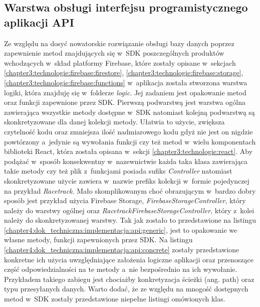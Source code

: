 \documentclass[../Kamil_Kowalewski_Main.tex]{subfiles}
\begin{document}
{{        \subsection{Warstwa obsługi interfejsu programistycznego aplikacji API}
        \label{chapter4:dok_techniczna:implementacja:api} {
            Ze względu na dosyć nowatorskie rozwiązanie obsługi bazy danych poprzez
            zapewnienie metod znajdujących się w~SDK poszczególnych produktów
            wchodzących w~skład platformy Firebase, które zostały opisane w~sekcjach
            \ref{chapter3:technologie:firebase:firestore},
            \ref{chapter3:technologie:firebase:storage},
            \ref{chapter3:technologie:firebase:functions} w~aplikacja została stworzona
            warstwa logiki, która znajduję się w~folderze \textit{logic}. Jej zadaniem
            jest opakowanie metod oraz funkcji zapewnione przez SDK. Pierwszą podwarstwą
            jest warstwa ogólna zawierająca wszystkie metody dostępne w~SDK natomiast
            kolejną podwarstwą są skonkretyzowane dla danej kolekcji metody. Ułatwia to
            użycie, zwiększa czytelność kodu oraz zmniejsza ilość nadmiarowego kodu
            gdyż nie jest on nigdzie powtórzony a~jedynie są wywołania funkcji czy też
            metod w~wielu komponentach biblioteki React, która została opisana w~sekcji
            \ref{chapter3:technologie:react}. Aby podążać w~sposób konsekwentny
            w~nazewnictwie każda taka klasa zawierająca takie metody czy też plik
            z~funkcjami posiada sufiks \textit{Controller} natomiast skonkretyzowane
            użycie zawiera w~nazwie prefiks kolekcji w~formie pojedynczej na przykład
            \textit{Racetrack}. Mało skomplikowanym choć obrazującym w~bardzo dobry
            sposób jest przykład użycia Firebase Storage,
            \textit{FirebaseStorageController}, który należy do warstwy ogólnej oraz
            \textit{RacetrackFirebaseStorageController}, który z~kolei należy do
            skonkretyzowanej warstwy. Tak jak zostało to przedstawione na listingu
            \ref{chapter4:dok_techniczna:implementacja:api:generic}, jest to opakowanie
            we własne metody, funkcji zapewnionych przez SDK. Na listingu
            \ref{chapter4:dok_techniczna:implementacja:api:concrete} zostały
            przedstawione konkretne ich użycia uwzględniające założenia logiczne
            aplikacji oraz przenoszące część odpowiedzialności na te metody a~nie
            bezpośrednio na ich wywołanie. Przykładem takiego zabiegu jest chociażby
            konkretyzacja ścieżki (ang. path) oraz typu przesyłanych danych. Warto
            dodać, że ze względu na mnogość dostępnych metod w~SDK zostały
            przedstawione niepełne listingi omówionych klas.

}}}
\end{document}
